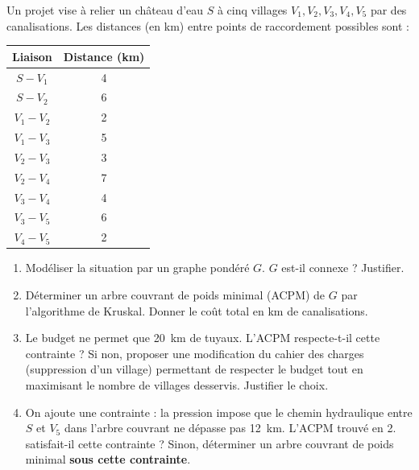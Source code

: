 \documentclass[11pt]{article}
\begin{document}
\begin{exercice}
Un projet vise à relier un château d'eau $S$ à cinq villages $V_1, V_2, V_3, V_4, V_5$ par des canalisations. Les distances (en km) entre points de raccordement possibles sont :
\begin{center}
\begin{tabular}{c|c}
Liaison & Distance (km) \\ \hline
$S - V_1$ & 4 \\
$S - V_2$ & 6 \\
$V_1 - V_2$ & 2 \\
$V_1 - V_3$ & 5 \\
$V_2 - V_3$ & 3 \\
$V_2 - V_4$ & 7 \\
$V_3 - V_4$ & 4 \\
$V_3 - V_5$ & 6 \\
$V_4 - V_5$ & 2 \\
\end{tabular}
\end{center}
\begin{enumerate}
\item Modéliser la situation par un graphe pondéré $G$. $G$ est-il connexe ? Justifier.
\item Déterminer un arbre couvrant de poids minimal (ACPM) de $G$ par l'algorithme de Kruskal. Donner le coût total en km de canalisations.
\item Le budget ne permet que \SI{20}{km} de tuyaux. L'ACPM respecte-t-il cette contrainte ? Si non, proposer une modification du cahier des charges (suppression d'un village) permettant de respecter le budget tout en maximisant le nombre de villages desservis. Justifier le choix.
\item On ajoute une contrainte : la pression impose que le chemin hydraulique entre $S$ et $V_5$ dans l'arbre couvrant ne dépasse pas \SI{12}{km}. L'ACPM trouvé en 2. satisfait-il cette contrainte ? Sinon, déterminer un arbre couvrant de poids minimal \textbf{sous cette contrainte}.
\end{enumerate}
\end{exercice}
\end{document}
